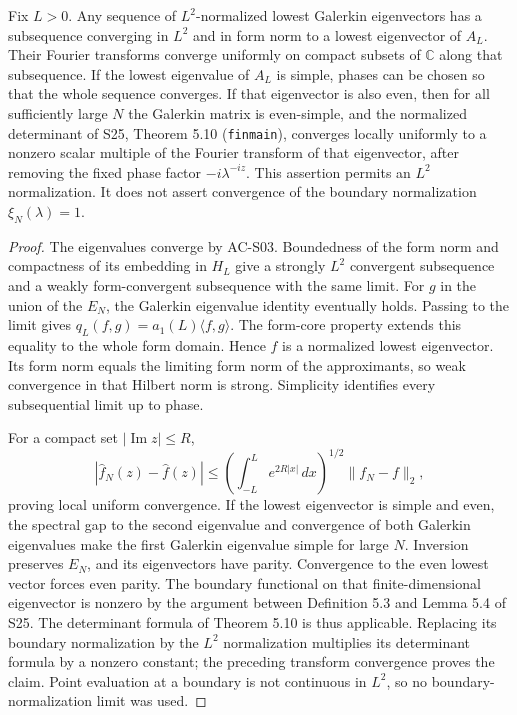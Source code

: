 \begin{proposition}
\label{AC-S06}
Fix \(L>0\).  Any sequence of \(L^2\)-normalized lowest Galerkin
eigenvectors has a subsequence converging in \(L^2\) and in form norm
to a lowest eigenvector of \(A_L\).  Their Fourier transforms converge
uniformly on compact subsets of \(\mathbb C\) along that subsequence.
If the lowest eigenvalue of \(A_L\) is simple, phases can be chosen so
that the whole sequence converges.  If that eigenvector is also even,
then for all sufficiently large \(N\) the Galerkin matrix is even-simple,
and the normalized determinant of S25, Theorem 5.10
(\texttt{finmain}), converges locally uniformly to a nonzero scalar
multiple of the Fourier transform of that eigenvector, after removing
the fixed phase factor \(-i\lambda^{-iz}\).
This assertion permits an \(L^2\) normalization.  It does not assert
convergence of the boundary normalization \(\xi_N(\lambda)=1\).
\end{proposition}
\begin{proof}
The eigenvalues converge by AC-S03.  Boundedness of the form norm and
compactness of its embedding in \(H_L\) give a strongly \(L^2\)
convergent subsequence and a weakly form-convergent subsequence with
the same limit.  For \(g\) in the union of the \(E_N\), the Galerkin
eigenvalue identity eventually holds.  Passing to the limit gives
\(q_L(f,g)=a_1(L)\langle f,g\rangle\).  The form-core property
extends this equality to the whole form domain.  Hence \(f\) is a
normalized lowest eigenvector.  Its form norm equals the limiting form
norm of the approximants, so weak convergence in that Hilbert norm is
strong.  Simplicity identifies every subsequential limit up to phase.

For a compact set \(|\operatorname{Im}z|\leq R\),
\[
 |\widehat f_N(z)-\widehat f(z)|
 \leq\left(\int_{-L}^Le^{2R|x|}\,dx\right)^{1/2}\|f_N-f\|_2,
\]
proving local uniform convergence.  If the lowest eigenvector is simple
and even, the spectral gap to the second eigenvalue and convergence
of both Galerkin eigenvalues make the first Galerkin eigenvalue simple
for large \(N\).  Inversion preserves \(E_N\), and its eigenvectors
have parity.  Convergence to the even lowest vector forces even parity.
The boundary functional on that finite-dimensional eigenvector is
nonzero by the argument between Definition 5.3 and Lemma 5.4 of S25.
The determinant formula of Theorem 5.10 is thus applicable.  Replacing
its boundary normalization by the \(L^2\) normalization multiplies
its determinant formula by a nonzero constant; the preceding transform
convergence proves the claim.  Point evaluation at a boundary is not
continuous in \(L^2\), so no boundary-normalization limit was used.
\end{proof}

